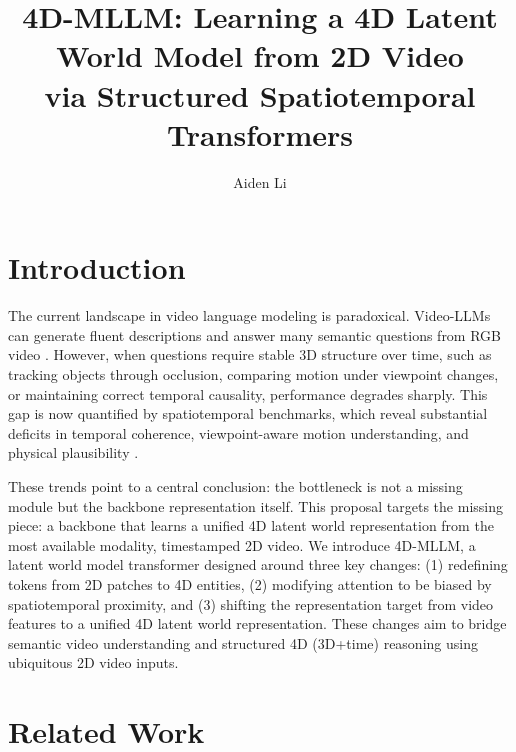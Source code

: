 \documentclass[12pt]{article}
\title{\large\bfseries 4D-MLLM: Learning a 4D Latent World Model from 2D Video \\ via Structured Spatiotemporal Transformers}
\author{Aiden Li}
\date{}
\begin{document}
\maketitle

\section{Introduction}
\label{sec:introduction}

The current landscape in video language modeling is paradoxical. Video-LLMs can generate fluent descriptions and answer many semantic questions from RGB video \cite{zhang2023videollamainstructiontunedaudiovisuallanguage, cheng2024videollama2advancingspatialtemporal, zhang2024llavanextvideo}. However, when questions require stable 3D structure over time, such as tracking objects through occlusion, comparing motion under viewpoint changes, or maintaining correct temporal causality, performance degrades sharply. This gap is now quantified by spatiotemporal benchmarks, which reveal substantial deficits in temporal coherence, viewpoint-aware motion understanding, and physical plausibility \cite{zhou2025vlm4dspatiotemporalawarenessvision, zhu20254dbenchbenchmarkingmultimodallarge, wang2025spatial4dbenchversatile4dspatial}.

These trends point to a central conclusion: the bottleneck is not a missing module but the backbone representation itself. This proposal targets the missing piece: a backbone that learns a unified 4D latent world representation from the most available modality, timestamped 2D video. We introduce 4D-MLLM, a latent world model transformer designed around three key changes: (1) redefining tokens from 2D patches to 4D entities, (2) modifying attention to be biased by spatiotemporal proximity, and (3) shifting the representation target from video features to a unified 4D latent world representation. These changes aim to bridge semantic video understanding and structured 4D (3D+time) reasoning using ubiquitous 2D video inputs.

\section{Related Work}
\label{sec:related}
\end{document}
